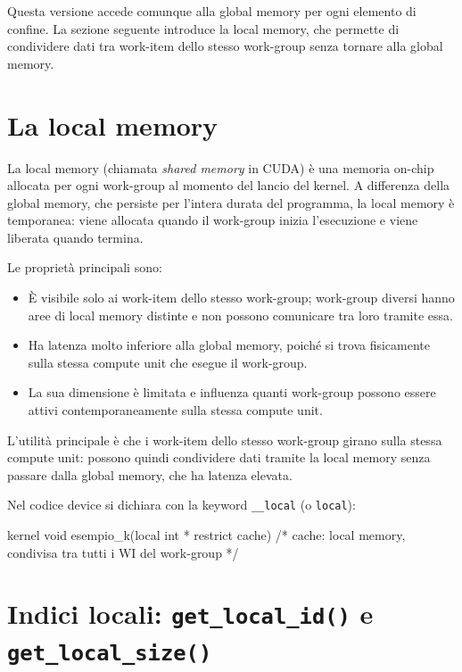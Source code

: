Questa versione accede comunque alla global memory per ogni elemento di confine. La sezione seguente introduce la local memory, che permette di condividere dati tra work-item dello stesso work-group senza tornare alla global memory.

\section{La local memory}\label{sec:opencl_lmem_concetto}

La local memory (chiamata \emph{shared memory} in CUDA) è una memoria on-chip allocata per ogni work-group al momento del lancio del kernel. A differenza della global memory, che persiste per l'intera durata del programma, la local memory è temporanea: viene allocata quando il work-group inizia l'esecuzione e viene liberata quando termina.

\noindent
Le proprietà principali sono:
\begin{itemize}
    \item È visibile solo ai work-item dello stesso work-group; work-group diversi hanno aree di local memory distinte e non possono comunicare tra loro tramite essa.
    \item Ha latenza molto inferiore alla global memory, poiché si trova fisicamente sulla stessa compute unit che esegue il work-group.
    \item La sua dimensione è limitata e influenza quanti work-group possono essere attivi contemporaneamente sulla stessa compute unit.
\end{itemize}

L'utilità principale è che i work-item dello stesso work-group girano sulla stessa compute unit: possono quindi condividere dati tramite la local memory senza passare dalla global memory, che ha latenza elevata.

Nel codice device si dichiara con la keyword \texttt{\_\_local} (o \texttt{local}):

\begin{code}[caption={Dichiarazione di un parametro in local memory}, label={code:lmem_decl}]
kernel void esempio_k(local int * restrict cache)
{
    /* cache: local memory, condivisa tra tutti i WI del work-group */
}
\end{code}

\section{Indici locali: \texttt{get\_local\_id()} e \texttt{get\_local\_size()}}\label{sec:opencl_lmem_ids}

